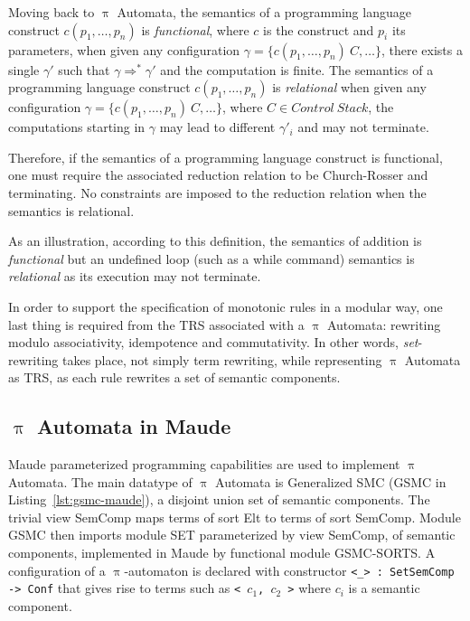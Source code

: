 \documentclass[a4paper,openany]{book}
\begin{document}

Moving back to $\uppi$ Automata, the
semantics of a programming language construct $c(p_1, \ldots, p_n)$ is
\emph{functional}, where $c$ is the construct and $p_i$ its
parameters, when given any configuration
$\gamma = \{ c(p_1, \ldots, p_n) ~C, \ldots\}$, there exists a single
$\gamma'$ such that $\gamma \Rightarrow^* \gamma'$ and the computation is finite. The semantics of a
programming language construct $c(p_1, \ldots, p_n)$ is
\emph{relational} when given any configuration
$\gamma = \{ c(p_1, \ldots, p_n)~ C, \ldots\}$, where
$C \in \mathit{Control~Stack}$, the computations starting in $\gamma$ may lead to different $\gamma'_i$ and 
may not terminate.

Therefore, if the semantics of a programming language construct is
functional, one must require the associated reduction relation to be
Church-Rosser and terminating. No constraints are imposed to the
reduction relation when the semantics is relational.

As an illustration, according to this definition, the semantics of
addition is \emph{functional} but an undefined loop (such as a while
command) semantics is \emph{relational} as its execution may not
terminate.
%

In order to support the specification of monotonic rules in a modular
way, one last thing is required from the TRS
associated with a $\uppi$ Automata: rewriting modulo
associativity, idempotence and commutativity. In other words, \emph{set}-rewriting takes place, not simply term rewriting, while
representing $\uppi$ Automata as TRS, as each rule rewrites a set of semantic components.


\subsection{$\uppi$ Automata in Maude}\label{sec:gia-in-maude}

Maude parameterized programming capabilities are used to implement 
$\uppi$ Automata. The main datatype of $\uppi$ Automata is Generalized SMC (GSMC in Listing~\ref{lst:gsmc-maude}), a disjoint union set of semantic components. 
The trivial view SemComp maps terms of sort Elt to terms of sort SemComp.   
Module GSMC then imports module SET parameterized by
view SemComp, of semantic components,
implemented in Maude by functional module GSMC-SORTS. 
A configuration of a $\uppi$-automaton is declared with 
constructor \texttt{<\_> : Set{SemComp} -> Conf} that gives rise to terms such as 
\texttt{< $c_1$, $c_2$ >} where \texttt{$c_i$} is a semantic component.
\end{document}
